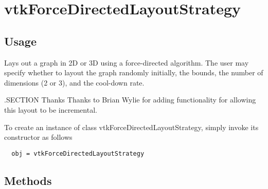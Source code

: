 \section{vtkForceDirectedLayoutStrategy}

\subsection{Usage}

 Lays out a graph in 2D or 3D using a force-directed algorithm.
 The user may specify whether to layout the graph randomly initially,
 the bounds, the number of dimensions (2 or 3), and the cool-down rate.

 .SECTION Thanks
 Thanks to Brian Wylie for adding functionality for allowing this layout
 to be incremental.

To create an instance of class vtkForceDirectedLayoutStrategy, simply
invoke its constructor as follows
\begin{verbatim}
  obj = vtkForceDirectedLayoutStrategy
\end{verbatim}
\subsection{Methods}

